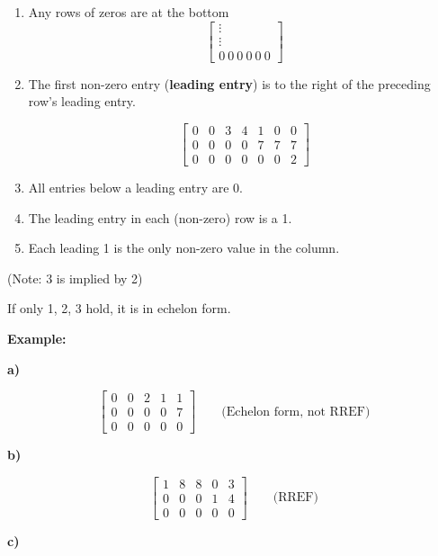 \documentclass{article}
\begin{document}
\begin{enumerate}
  \item Any rows of zeros are at the bottom
  \[
  \begin{bmatrix}
    \vdots \\
    \vdots \\
    0 \ 0 \ 0 \ 0 \ 0 \ 0
  \end{bmatrix}
  \]

  \item The first non-zero entry (\textbf{leading entry}) is to the right of the preceding row's leading entry.
  
  \[
  \begin{bmatrix}
    0 & 0 & 3 & 4 & 1 & 0 & 0 \\
    0 & 0 & 0 & 0 & 7 & 7 & 7 \\
    0 & 0 & 0 & 0 & 0 & 0 & 2
  \end{bmatrix}
  \]

  \item All entries below a leading entry are 0.

  \item The leading entry in each (non-zero) row is a 1.

  \item Each leading 1 is the only non-zero value in the column.

\end{enumerate}

(Note: 3 is implied by 2)

\medskip

If only 1, 2, 3 hold, it is in echelon form.

\medskip

\textbf{Example:}

\textbf{a)}

\[
\begin{bmatrix}
  0 & 0 & 2 & 1 & 1 \\
  0 & 0 & 0 & 0 & 7 \\
  0 & 0 & 0 & 0 & 0
\end{bmatrix}
\qquad \text{(Echelon form, not RREF)}
\]

\textbf{b)}

\[
\begin{bmatrix}
  1 & 8 & 8 & 0 & 3 \\
  0 & 0 & 0 & 1 & 4 \\
  0 & 0 & 0 & 0 & 0
\end{bmatrix}
\qquad \text{(RREF)}
\]


\textbf{c)}
\end{document}
